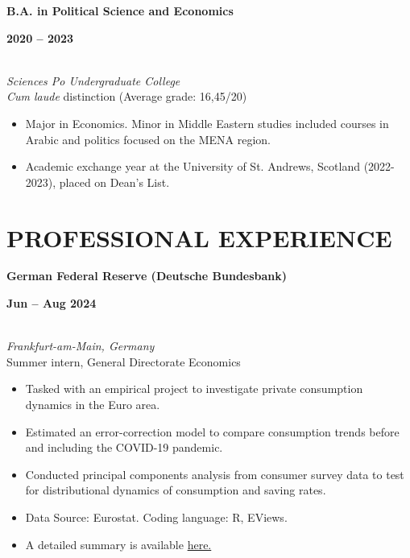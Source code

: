 \documentclass[a4paper,9pt]{extarticle}
\begin{document}
\noindent
\begin{minipage}[t]{0.7\textwidth}
  \textbf{B.A. in Political Science and Economics}
\end{minipage}%
\begin{minipage}[t]{0.3\textwidth}
  \raggedleft \textbf{2020 -- 2023}
\end{minipage}
\\
\textit{Sciences Po Undergraduate College} \\
\textit{Cum laude} distinction (Average grade: 16,45/20)
\begin{itemize}[noitemsep, topsep=0pt, left=0.65cm]
    \item Major in Economics. Minor in Middle Eastern studies included courses in Arabic and politics focused on the MENA region. 
    \item Academic exchange year at the University of St. Andrews, Scotland (2022-2023), placed on Dean's List. \\
\end{itemize} 


\section*{PROFESSIONAL EXPERIENCE}

\noindent
\newline
\begin{minipage}[t]{0.7\textwidth}
  \textbf{German Federal Reserve (Deutsche Bundesbank)}
\end{minipage}%
\begin{minipage}[t]{0.3\textwidth}
  \raggedleft \textbf{Jun -- Aug 2024}
\end{minipage}
\\
\textit{Frankfurt-am-Main, Germany} \\ 
Summer intern, General Directorate Economics 
\begin{itemize}[noitemsep, topsep=0pt, left=0.65cm]
    \item Tasked with an empirical project to investigate private consumption dynamics in the Euro area.
    \item Estimated an error-correction model to compare consumption trends before and including the COVID-19 pandemic.
    \item Conducted principal components analysis from consumer survey data to test for distributional dynamics of consumption and saving rates.
    \item Data Source: Eurostat. Coding language: R, EViews.
    \item A detailed summary is available \href{https://lionelchambon.github.io/files/Chambon_BundesbankProject_EN.pdf}{here.}
    \\
\end{itemize}
\end{document}
